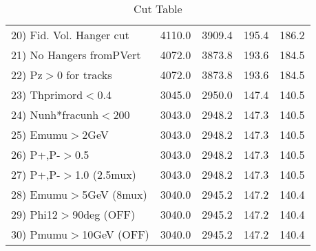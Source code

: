 \begin{table}[h!]
\begin{tabular}{||l||r|r|r|r||}
 20) Fid. Vol. Hanger cut &      4110.0 &      3909.4 &       195.4 &       186.2 \\
 21) No Hangers fromPVert &      4072.0 &      3873.8 &       193.6 &       184.5 \\
 22) Pz$>$0 for tracks    &      4072.0 &      3873.8 &       193.6 &       184.5 \\
 23) Thprimord$<$0.4      &      3045.0 &      2950.0 &       147.4 &       140.5 \\
 24) Nunh*fracunh$<$200   &      3043.0 &      2948.2 &       147.3 &       140.5 \\
 25) Emumu$>$2GeV         &      3043.0 &      2948.2 &       147.3 &       140.5 \\
 26) P+,P-$>$0.5          &      3043.0 &      2948.2 &       147.3 &       140.5 \\
 27) P+,P-$>$1.0 (2.5mux) &      3043.0 &      2948.2 &       147.3 &       140.5 \\
 28) Emumu$>$5GeV  (8mux) &      3040.0 &      2945.2 &       147.2 &       140.4 \\
 29) Phi12$>$90deg  (OFF) &      3040.0 &      2945.2 &       147.2 &       140.4 \\
 30) Pmumu$>$10GeV  (OFF) &      3040.0 &      2945.2 &       147.2 &       140.4 \\
 \hline
 \hline
 \end{tabular}
 \caption{Cut Table \cohrp  }
 \label{tab-cut_crhop}
 \end{table}

